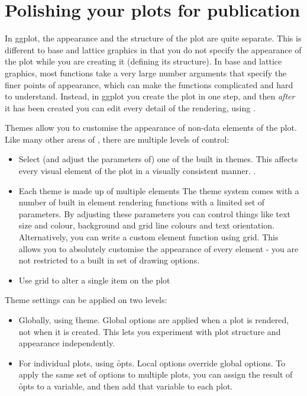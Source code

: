 

\chapter{Polishing your plots for publication}
\label{cha:theming}


In ggplot, the appearance and the structure of the plot are quite separate.  This is different to base and lattice graphics in that you do not specify the appearance of the plot while you are creating it (defining its structure).  In base and lattice graphics, most functions take a very large number arguments that specify the finer points of appearance, which can make the functions complicated and hard to understand.  Instead, in ggplot you create the plot in one step, and then {\em after} it has been created you can edit every detail of the rendering, using .

Themes allow you to customise the appearance of non-data elements of the plot.  Like many other areas of \ggplot, there are multiple levels of control:

\begin{itemize}
  \item Select (and adjust the parameters of) one of the built in themes.  This affects every visual element of the plot in a visually consistent manner.  .

  \item Each theme is made up of multiple elements The theme system comes with a number of built in element rendering functions with a limited set of parameters.  By adjusting these parameters you can control things like text size and colour, background and grid line colours and text orientation. Alternatively, you can write a custom element function using grid.  This allows you to absolutely customise the appearance of every element - you are not restricted to a built in set of drawing options.  

  \item Use grid to alter a single item on the plot
\end{itemize}

\noindent Theme settings can be applied on two levels:

\begin{itemize}
  \item Globally, using \f{theme}.  Global options are applied when a plot is rendered, not when it is created.  This lets you experiment with plot structure and appearance independently.

  \item For individual plots, using \f{opts}.  Local options override global options.  To apply the same set of options to multiple plots, you can assign the result of \f{opts} to a variable, and then add that variable to each plot.
\end{itemize}


